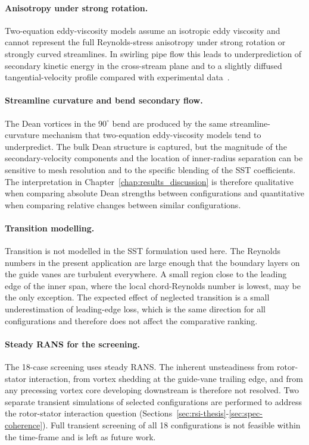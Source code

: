 \paragraph{Anisotropy under strong rotation.} Two-equation eddy-viscosity models assume an isotropic eddy viscosity and cannot represent the full Reynolds-stress anisotropy under strong rotation or strongly curved streamlines. In swirling pipe flow this leads to underprediction of secondary kinetic energy in the cross-stream plane and to a slightly diffused tangential-velocity profile compared with experimental data~\cite{EscueCui2010}.
 
\paragraph{Streamline curvature and bend secondary flow.} The Dean vortices in the $90^\circ$ bend are produced by the same streamline-curvature mechanism that two-equation eddy-viscosity models tend to underpredict. The bulk Dean structure is captured, but the magnitude of the secondary-velocity components and the location of inner-radius separation can be sensitive to mesh resolution and to the specific blending of the SST coefficients. The interpretation in Chapter~\ref{chap:results_discussion} is therefore qualitative when comparing absolute Dean strengths between configurations and quantitative when comparing relative changes between similar configurations.
 
\paragraph{Transition modelling.} Transition is not modelled in the SST formulation used here. The Reynolds numbers in the present application are large enough that the boundary layers on the guide vanes are turbulent everywhere. A small region close to the leading edge of the inner span, where the local chord-Reynolds number is lowest, may be the only exception. The expected effect of neglected transition is a small underestimation of leading-edge loss, which is the same direction for all configurations and therefore does not affect the comparative ranking.
 
\paragraph{Steady RANS for the screening.} The 18-case screening uses steady RANS. The inherent unsteadiness from rotor-stator interaction, from vortex shedding at the guide-vane trailing edge, and from any precessing vortex core developing downstream is therefore not resolved. Two separate transient simulations of selected configurations are performed to address the rotor-stator interaction question (Sections~\ref{sec:rsi-thesis}-\ref{sec:spec-coherence}). Full transient screening of all 18 configurations is not feasible within the time-frame and is left as future work.

